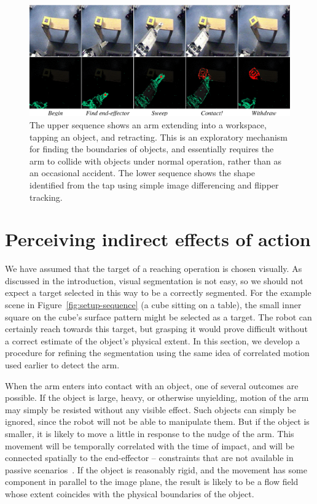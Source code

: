 \begin{figure}[tb]
\begin{center}
\includegraphics[width=\columnwidth]{poking-sequence.eps}
\caption{ 
\label{fig:poking-sequence}
%
  The upper sequence shows an arm extending into a workspace, tapping
  an object, and retracting.  This is an exploratory mechanism for
  finding the boundaries of objects, and essentially requires the arm
  to collide with objects under normal operation, rather than as an
  occasional accident.  The lower sequence shows the shape
  identified from the tap using simple image differencing and flipper
  tracking.
%
}
\end{center}
\end{figure}



\section{Perceiving indirect effects of action}

We have assumed that the target of a reaching operation is chosen
visually.  As discussed in the introduction, visual
segmentation is not easy, so we should not expect a target selected in
this way to be a correctly segmented.  For the example scene in
Figure~\ref{fig:setup-sequence} (a cube sitting on a table), the small
inner square on the cube's surface pattern might be selected as a
target.  The robot can certainly reach towards this target, but
grasping it would prove difficult without a correct estimate of the
object's physical extent.  In this section, we develop a procedure
for refining the segmentation using the same idea of correlated
motion used earlier to detect the arm.

When the arm enters into contact with an object, one of several
outcomes are possible.  If the object is large, heavy, or otherwise
unyielding, motion of the arm may simply be resisted without any
visible effect.  Such objects can simply be ignored, since the robot
will not be able to manipulate them.  But if the object is smaller, it
is likely to move a little in response to the nudge of the arm.  This
movement will be temporally correlated with the time of impact, and
will be connected spatially to the end-effector -- constraints that
are not available in passive scenarios~\cite{birchfield99depth}.  If
the object is reasonably rigid, and the movement has some component in
parallel to the image plane, the result is likely to be a flow field
whose extent coincides with the physical boundaries of the object.



